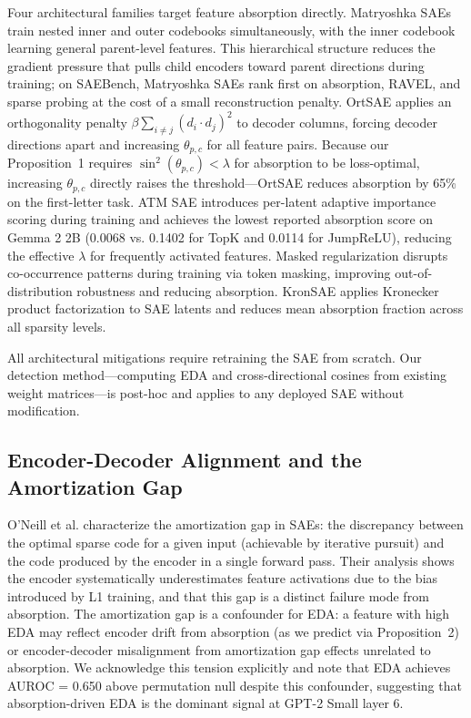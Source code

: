 \documentclass{article}
\begin{document}
Four architectural families target feature absorption directly. Matryoshka SAEs
\cite{bussmann2025matryoshka} train nested inner and outer codebooks simultaneously, with the
inner codebook learning general parent-level features. This hierarchical structure reduces the
gradient pressure that pulls child encoders toward parent directions during training; on
SAEBench, Matryoshka SAEs rank first on absorption, RAVEL, and sparse probing at the cost of a
small reconstruction penalty. OrtSAE \cite{korznikov2025ortsae} applies an orthogonality
penalty $\beta \sum_{i \neq j} (d_i \cdot d_j)^2$ to decoder columns, forcing decoder
directions apart and increasing $\theta_{p,c}$ for all feature pairs. Because our Proposition~1
requires $\sin^2(\theta_{p,c}) < \lambda$ for absorption to be loss-optimal, increasing
$\theta_{p,c}$ directly raises the threshold---OrtSAE reduces absorption by 65\% on the
first-letter task. ATM SAE \cite{li2025atm} introduces per-latent adaptive importance scoring
during training and achieves the lowest reported absorption score on Gemma 2 2B (0.0068 vs.
0.1402 for TopK and 0.0114 for JumpReLU), reducing the effective $\lambda$ for frequently
activated features. Masked regularization \cite{narayanaswamy2026masked} disrupts
co-occurrence patterns during training via token masking, improving out-of-distribution
robustness and reducing absorption. KronSAE \cite{kronsae2025} applies Kronecker product
factorization to SAE latents and reduces mean absorption fraction across all sparsity levels.

All architectural mitigations require retraining the SAE from scratch. Our detection
method---computing EDA and cross-directional cosines from existing weight matrices---is
post-hoc and applies to any deployed SAE without modification.


\subsection{Encoder-Decoder Alignment and the Amortization Gap}

O'Neill et al. \citeyear{oneill2024amortization} characterize the amortization gap in SAEs:
the discrepancy between the optimal sparse code for a given input (achievable by iterative
pursuit) and the code produced by the encoder in a single forward pass. Their analysis shows
the encoder systematically underestimates feature activations due to the bias introduced by
L1 training, and that this gap is a distinct failure mode from absorption. The amortization
gap is a confounder for EDA: a feature with high EDA may reflect encoder drift from
absorption (as we predict via Proposition~2) or encoder-decoder misalignment from amortization
gap effects unrelated to absorption. We acknowledge this tension explicitly and note that EDA
achieves AUROC = 0.650 above permutation null despite this confounder, suggesting that
absorption-driven EDA is the dominant signal at GPT-2 Small layer 6.
\end{document}

